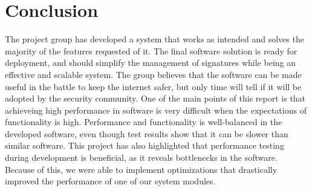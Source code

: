 \section{Conclusion}
The project group has developed a system that works as intended and solves the
majority of the features requested of it. The final software solution is ready
for deployment, and should simplify the management of \snort{} signatures while
being an effective and scalable system. The group believes that the software can
be made useful in the battle to keep the internet safer, but only time will tell
if it will be adopted by the security community. One of the main points of this
report is that achieveing high performance in software is very difficult when
the expectations of functionality is high. Performance and functionality is
well-balanced in the developed software, even though test results show that it
can be slower than similar software. This project has also highlighted that
performance testing during development is beneficial, as it reveals bottlenecks
in the software. Because of this, we were able to implement optimizations that
drastically improved the performance of one of our system modules.